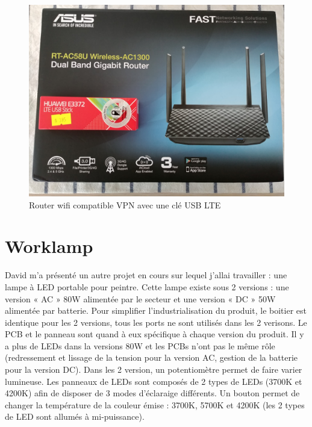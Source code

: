\documentclass[a4paper, 11pt]{report}
\begin{document}
\begin{figure}[!h]
\begin{center}
\includegraphics[scale=0.12]{figures/photos/wifi_router.jpg}
\end{center}
\caption{Router wifi compatible VPN avec une clé USB LTE} %
\label{fig:wifi_router}
\end{figure}

\section{Worklamp}
David m’a présenté un autre projet en cours sur lequel j'allai travailler : une lampe à LED portable pour peintre. Cette lampe existe sous 2 versions : une version « AC » 80W alimentée par le secteur et une version « DC » 50W alimentée par batterie. Pour simplifier l'industrialisation du produit, le boitier est identique pour les 2 versions, tous les ports ne sont utilisés dans les 2 verisons. Le PCB et le panneau sont quand à eux spécifique à chaque version du produit. Il y a plus de LEDs dans la versions 80W et les PCBs n'ont pas le même rôle (redressement et lissage de la tension pour la version AC, gestion de la batterie pour la version DC).
Dans les 2 version, un potentiomètre permet de faire varier lumineuse. Les panneaux de LEDs sont composés de 2 types de LEDs (3700K et 4200K) afin de disposer de 3 modes d'éclaraige différents. Un bouton permet de changer la température de la couleur émise : 3700K, 5700K et 4200K (les 2 types de LED sont allumés à mi-puissance). 
\end{document}
